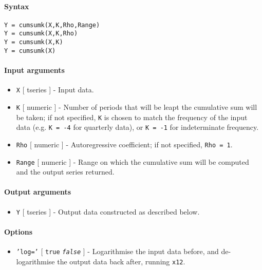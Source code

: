 


	\paragraph{Syntax}\label{syntax}

\begin{verbatim}
Y = cumsumk(X,K,Rho,Range)
Y = cumsumk(X,K,Rho)
Y = cumsumk(X,K)
Y = cumsumk(X)
\end{verbatim}

\paragraph{Input arguments}\label{input-arguments}

\begin{itemize}
\item
  \texttt{X} {[} tseries {]} - Input data.
\item
  \texttt{K} {[} numeric {]} - Number of periods that will be leapt the
  cumulative sum will be taken; if not specified, \texttt{K} is chosen
  to match the frequency of the input data (e.g. \texttt{K = -4} for
  quarterly data), or \texttt{K = -1} for indeterminate frequency.
\item
  \texttt{Rho} {[} numeric {]} - Autoregressive coefficient; if not
  specified, \texttt{Rho = 1}.
\item
  \texttt{Range} {[} numeric {]} - Range on which the cumulative sum
  will be computed and the output series returned.
\end{itemize}

\paragraph{Output arguments}\label{output-arguments}

\begin{itemize}
\itemsep1pt\parskip0pt
\item
  \texttt{Y} {[} tseries {]} - Output data constructed as described
  below.
\end{itemize}

\paragraph{Options}\label{options}

\begin{itemize}
\itemsep1pt\parskip0pt
\item
  \texttt{'log='} {[} \texttt{true} \textbar{} \emph{\texttt{false}} {]}
  - Logarithmise the input data before, and de-logarithmise the output
  data back after, running \texttt{x12}.
\end{itemize}

